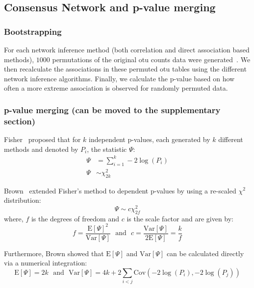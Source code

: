   \subsection*{Consensus Network and p-value merging}
  \vspace{-5mm}

  \subsubsection*{Bootstrapping}
  For each network inference method (both correlation and direct association based methods), $1000$ permutations of the original \ac{otu} counts data were generated~\cite{Watts2018}.
  We then recalculate the associations in these permuted \ac{otu} tables using the different network inference algorithms.
  Finally, we calculate the p-value based on how often a more extreme association is observed for randomly permuted data.

  \subsubsection*{p-value merging (can be moved to the supplementary section)}
  Fisher~\cite{fisher_224a_1948} proposed that for $k$ independent p-values, each generated by $k$ different methods and denoted by $P_i$, the statistic $\Psi$:
  \begin{equation*}
    \begin{aligned}
        \Psi &= \sum_{i=1}^k -2 \log \left( P_i \right) \\
        \Psi &\sim \chi^2_{2k}
    \end{aligned}
  \end{equation*}

  Brown~\cite{brown_400_1975} extended Fisher's method to dependent p-values by using a re-scaled $\chi^2$ distribution:
  \begin{equation*}
    \Psi \sim c \chi^2_{2f}
  \end{equation*}
  where, $f$ is the degrees of freedom and $c$ is the scale factor and are given by:
  \begin{equation*}
    f = \frac{\mathrm{E}[\Psi]^2}{\mathrm{Var}[\Psi]} ~~~\text{and}~~~ c = \frac{\mathrm{Var}[\Psi]}{2\mathrm{E}[\Psi]} = \frac{k}{f}
  \end{equation*}

  Furthermore, Brown showed that $\mathrm{E}[\Psi]$ and $\mathrm{Var}[\Psi]$ can be calculated directly via a numerical integration:
  \begin{equation*}
    \mathrm{E}[\Psi] = 2k ~~~\text{and}~~~ \mathrm{Var}[\Psi] = 4k + 2\sum_{i<j} \mathrm{Cov}\left( -2\log(P_i), -2\log(P_j) \right)
  \end{equation*}

